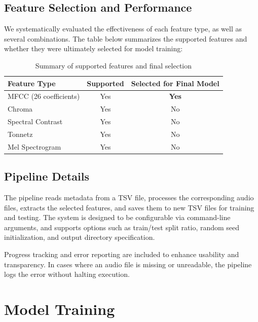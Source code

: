 \documentclass[a4paper,12pt]{article}
\begin{document}
\subsection*{Feature Selection and Performance}

We systematically evaluated the effectiveness of each feature type, as well as several combinations. The table below summarizes the supported features and whether they were ultimately selected for model training:

\begin{table}[H]
\centering
\begin{tabular}{|l|c|c|}
\hline
\textbf{Feature Type} & \textbf{Supported} & \textbf{Selected for Final Model} \\
\hline
MFCC (26 coefficients)      & Yes & \textbf{Yes} \\
Chroma                      & Yes & No \\
Spectral Contrast           & Yes & No \\
Tonnetz                     & Yes & No \\
Mel Spectrogram             & Yes & No \\
\hline
\end{tabular}
\caption{Summary of supported features and final selection}
\label{tab:feature-selection}
\end{table}

\subsection*{Pipeline Details}

The pipeline reads metadata from a TSV file, processes the corresponding audio files, extracts the selected features, and saves them to new TSV files for training and testing. The system is designed to be configurable via command-line arguments, and supports options such as train/test split ratio, random seed initialization, and output directory specification.

Progress tracking and error reporting are included to enhance usability and transparency. In cases where an audio file is missing or unreadable, the pipeline logs the error without halting execution.

\newpage
\section{Model Training}
\label{sec:model-training}
\end{document}
